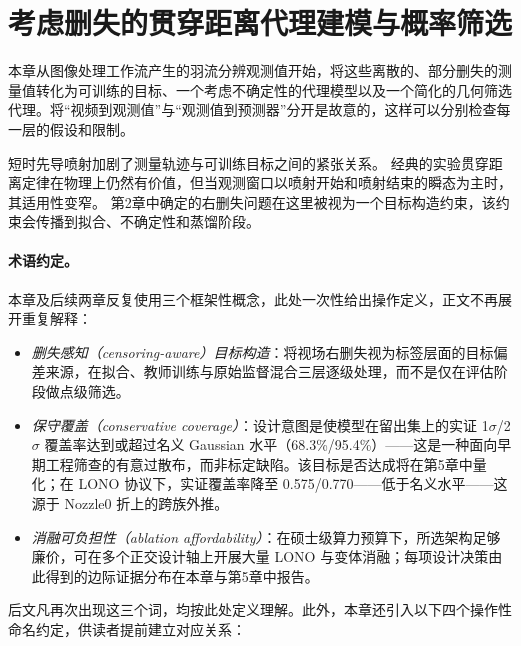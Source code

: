 \section{考虑删失的贯穿距离代理建模与概率筛选}

本章从图像处理工作流产生的羽流分辨观测值开始，将这些离散的、部分删失的测量值转化为可训练的目标、一个考虑不确定性的代理模型以及一个简化的几何筛选代理。将“视频到观测值”与“观测值到预测器”分开是故意的，这样可以分别检查每一层的假设和限制。

短时先导喷射加剧了测量轨迹与可训练目标之间的紧张关系。
经典的实验贯穿距离定律在物理上仍然有价值，但当观测窗口以喷射开始和喷射结束的瞬态为主时，其适用性变窄。
第2章中确定的右删失问题在这里被视为一个目标构造约束，该约束会传播到拟合、不确定性和蒸馏阶段。

\paragraph{术语约定。}本章及后续两章反复使用三个框架性概念，此处一次性给出操作定义，正文不再展开重复解释：
\begin{itemize}
  \item \emph{删失感知（censoring-aware）目标构造}：将视场右删失视为标签层面的目标偏差来源，在拟合、教师训练与原始监督混合三层逐级处理，而不是仅在评估阶段做点级筛选。
  \item \emph{保守覆盖（conservative coverage）}：设计意图是使模型在留出集上的实证 1$\sigma$/2$\sigma$ 覆盖率达到或超过名义 Gaussian 水平（68.3\%/95.4\%）——这是一种面向早期工程筛查的有意过散布，而非标定缺陷。该目标是否达成将在第5章中量化；在 LONO 协议下，实证覆盖率降至 0.575/0.770——低于名义水平——这源于 Nozzle0 折上的跨族外推。
  \item \emph{消融可负担性（ablation affordability）}：在硕士级算力预算下，所选架构足够廉价，可在多个正交设计轴上开展大量 LONO 与变体消融；每项设计决策由此得到的边际证据分布在本章与第5章中报告。
\end{itemize}
后文凡再次出现这三个词，均按此处定义理解。此外，本章还引入以下四个操作性命名约定，供读者提前建立对应关系：
